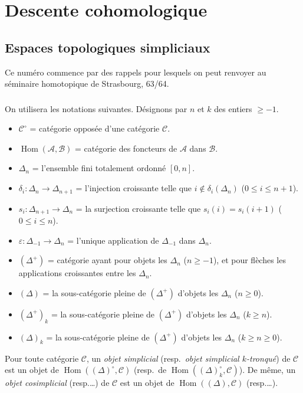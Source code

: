 \documentclass[11pt]{amsart}
\theoremstyle{plain}
\theoremstyle{definition}
\DeclareMathOperator{\Hom}{Hom}
\newcommand{\cA}{\mathcal{A}}
\newcommand{\cB}{\mathcal{B}}
\newcommand{\cC}{\mathcal{C}}
\begin{document}
\section{Descente cohomologique}

\subsection{Espaces topologiques simpliciaux}

Ce num\'ero commence par des rappels pour lesquels on peut renvoyer au s\'eminaire
homotopique de Strasbourg, 63/64.

\subsubsection{}
On utilisera les notations suivantes. D\'esignons par $n$ et $k$ des entiers $\geq -1$.

\begin{itemize}
\item $\cC^\circ$ = cat\'egorie oppos\'ee d'une cat\'egorie $\cC$.
\item $\Hom(\cA, \cB)$ = cat\'egorie des foncteurs de $\cA$ dans $\cB$.
\item $\Delta_n$ = l'ensemble fini totalement ordonn\'e $[0,n]$.
\item $\delta_i : \Delta_n \to \Delta_{n+1}$ = l'injection croissante telle que $i \notin \delta_i(\Delta_n)$ ($0 \leq i \leq n+1$).
\item $s_i : \Delta_{n+1} \to \Delta_n$ = la surjection croissante telle que $s_i(i) = s_i(i+1)$ ($0 \leq i \leq n$).
\item $\varepsilon : \Delta_{-1} \to \Delta_n$ = l'unique application de $\Delta_{-1}$ dans $\Delta_n$.
\item $(\Delta^+)$ = cat\'egorie ayant pour objets les $\Delta_n$ ($n \geq -1$), et pour fl\`eches les applications
croissantes entre les $\Delta_n$.
\item $(\Delta)$ = la sous-cat\'egorie pleine de $(\Delta^+)$ d'objets les $\Delta_n$ ($n \geq 0$).
\item $(\Delta^+)_k$ = la sous-cat\'egorie pleine de $(\Delta^+)$ d'objets les $\Delta_n$ ($k \geq n$).
\item $(\Delta)_k$ = la sous-cat\'egorie pleine de $(\Delta^+)$ d'objets les $\Delta_n$ ($k \geq n \geq 0$).
\end{itemize}

Pour toute cat\'egorie $\cC$, un \emph{objet simplicial} (resp.\ \emph{objet simplicial $k$-tronqu\'e}) de $\cC$ est
un objet de $\Hom((\Delta)^\circ, \cC)$ (resp.\ de $\Hom((\Delta)^\circ_k, \cC)$). De m\^eme, un \emph{objet cosimplicial} (resp.\ldots)
de $\cC$ est un objet de $\Hom((\Delta), \cC)$ (resp.\ldots).
\end{document}
